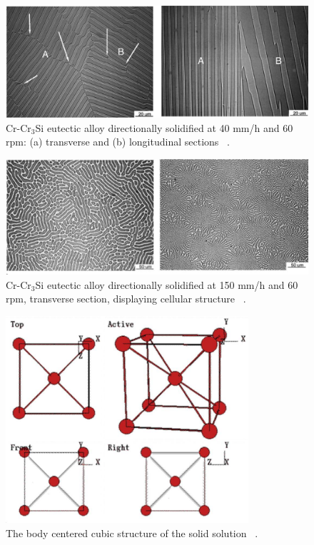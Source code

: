 \begin{figure}[hp!]
\begin{center}
\includegraphics[width=\textwidth]{DS_Cr-Cr3Si}
\caption{Cr-Cr$_3$Si eutectic alloy directionally solidified at 40 mm/h and 60 rpm: (a) transverse and (b) longitudinal sections ~\cite{bei03}.}\label{fig:DS_Cr-Cr3Si}
\end{center}
\end{figure}
%
\begin{figure}[hp!]
\begin{center}
\includegraphics[width=\textwidth]{DS_Cr-Cr3Si_bad}
\caption{Cr-Cr$_3$Si eutectic alloy directionally solidified at 150 mm/h and 60 rpm, transverse section, displaying cellular structure ~\cite{bei03}. }\label{fig:DS_Cr-Cr3Si_bad}
\end{center}
\end{figure} 
%
\begin{figure}[H]
\begin{center}
\includegraphics[width=9cm]{BCC}
\caption{The body centered cubic structure of the solid solution ~\cite{ashcroft76}.}\label{fig:BCC}
\end{center}
\end{figure} 
